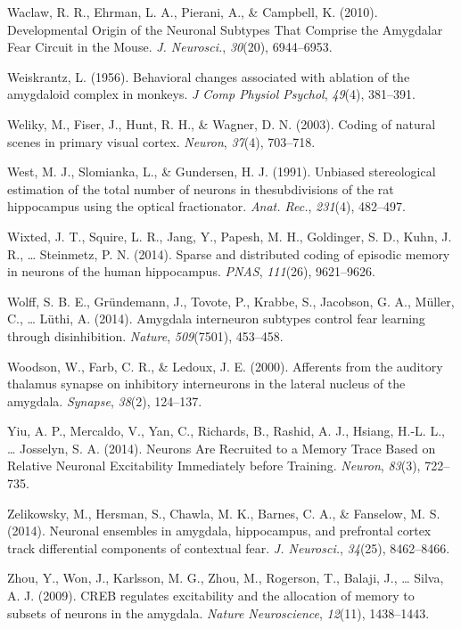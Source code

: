 \documentclass[12pt,a4paperpaper,]{report}
\begin{document}
\hypertarget{ref-waclawux5fdevelopmentalux5f2010}{}
Waclaw, R. R., Ehrman, L. A., Pierani, A., \& Campbell, K. (2010).
Developmental Origin of the Neuronal Subtypes That Comprise the
Amygdalar Fear Circuit in the Mouse. \emph{J. Neurosci.}, \emph{30}(20),
6944--6953.

\hypertarget{ref-weiskrantzux5fbehavioralux5f1956}{}
Weiskrantz, L. (1956). Behavioral changes associated with ablation of
the amygdaloid complex in monkeys. \emph{J Comp Physiol Psychol},
\emph{49}(4), 381--391.

\hypertarget{ref-welikyux5fcodingux5f2003}{}
Weliky, M., Fiser, J., Hunt, R. H., \& Wagner, D. N. (2003). Coding of
natural scenes in primary visual cortex. \emph{Neuron}, \emph{37}(4),
703--718.

\hypertarget{ref-westux5funbiasedux5f1991}{}
West, M. J., Slomianka, L., \& Gundersen, H. J. (1991). Unbiased
stereological estimation of the total number of neurons in
thesubdivisions of the rat hippocampus using the optical fractionator.
\emph{Anat. Rec.}, \emph{231}(4), 482--497.

\hypertarget{ref-wixtedux5fsparseux5f2014}{}
Wixted, J. T., Squire, L. R., Jang, Y., Papesh, M. H., Goldinger, S. D.,
Kuhn, J. R., \ldots{} Steinmetz, P. N. (2014). Sparse and distributed
coding of episodic memory in neurons of the human hippocampus.
\emph{PNAS}, \emph{111}(26), 9621--9626.

\hypertarget{ref-wolffux5famygdalaux5f2014}{}
Wolff, S. B. E., Gründemann, J., Tovote, P., Krabbe, S., Jacobson, G.
A., Müller, C., \ldots{} Lüthi, A. (2014). Amygdala interneuron subtypes
control fear learning through disinhibition. \emph{Nature},
\emph{509}(7501), 453--458.

\hypertarget{ref-woodsonux5fafferentsux5f2000}{}
Woodson, W., Farb, C. R., \& Ledoux, J. E. (2000). Afferents from the
auditory thalamus synapse on inhibitory interneurons in the lateral
nucleus of the amygdala. \emph{Synapse}, \emph{38}(2), 124--137.

\hypertarget{ref-yiuux5fneuronsux5f2014}{}
Yiu, A. P., Mercaldo, V., Yan, C., Richards, B., Rashid, A. J., Hsiang,
H.-L. L., \ldots{} Josselyn, S. A. (2014). Neurons Are Recruited to a
Memory Trace Based on Relative Neuronal Excitability Immediately before
Training. \emph{Neuron}, \emph{83}(3), 722--735.

\hypertarget{ref-zelikowskyux5fneuronalux5f2014}{}
Zelikowsky, M., Hersman, S., Chawla, M. K., Barnes, C. A., \& Fanselow,
M. S. (2014). Neuronal ensembles in amygdala, hippocampus, and
prefrontal cortex track differential components of contextual fear.
\emph{J. Neurosci.}, \emph{34}(25), 8462--8466.

\hypertarget{ref-zhouux5fcrebux5f2009}{}
Zhou, Y., Won, J., Karlsson, M. G., Zhou, M., Rogerson, T., Balaji, J.,
\ldots{} Silva, A. J. (2009). CREB regulates excitability and the
allocation of memory to subsets of neurons in the amygdala. \emph{Nature
Neuroscience}, \emph{12}(11), 1438--1443.
\end{document}
